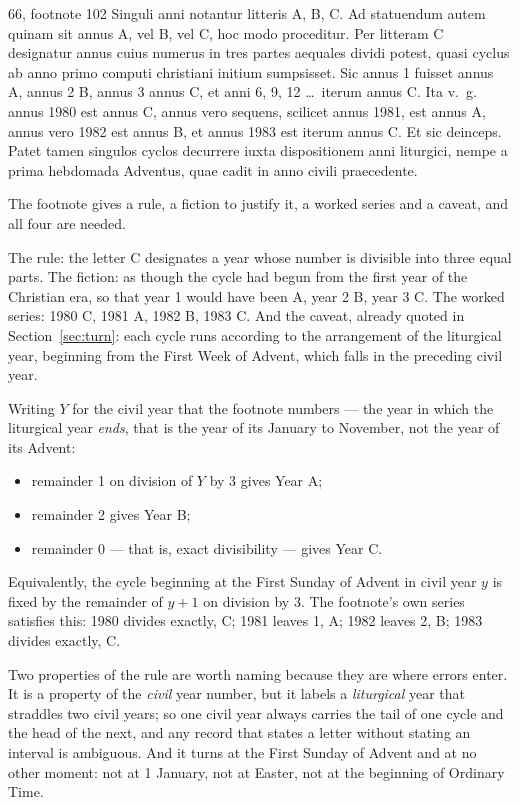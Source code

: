 \begin{normtext}{  66, footnote 102}
Singuli anni notantur litteris A, B, C. Ad statuendum autem quinam sit annus A, vel B, vel C, hoc
modo proceditur. Per litteram C designatur annus cuius numerus in tres partes aequales dividi
potest, quasi cyclus ab anno primo computi christiani initium sumpsisset. Sic annus 1 fuisset annus
A, annus 2 B, annus 3 annus C, et anni 6, 9, 12 \dots\ iterum annus C. Ita v.~g. annus 1980 est annus
C, annus vero sequens, scilicet annus 1981, est annus A, annus vero 1982 est annus B, et annus 1983
est iterum annus C. Et sic deinceps. Patet tamen singulos cyclos decurrere iuxta dispositionem anni
liturgici, nempe a prima hebdomada Adventus, quae cadit in anno civili praecedente.
\end{normtext}

The footnote gives a rule, a fiction to justify it, a worked series and a caveat, and all four are
needed.

The rule: the letter C designates a year whose number is divisible into three equal parts. The
fiction: as though the cycle had begun from the first year of the Christian era, so that year 1 would
have been A, year 2 B, year 3 C. The worked series: 1980 C, 1981 A, 1982 B, 1983 C. And the caveat,
already quoted in Section~\ref{sec:turn}: each cycle runs according to the arrangement of the
liturgical year, beginning from the First Week of Advent, which falls in the preceding civil year.

Writing $Y$ for the civil year that the footnote numbers --- the year in which the liturgical year
\emph{ends}, that is the year of its January to November, not the year of its Advent:

\begin{itemize}
\item remainder 1 on division of $Y$ by 3 gives Year A;
\item remainder 2 gives Year B;
\item remainder 0 --- that is, exact divisibility --- gives Year C.
\end{itemize}

Equivalently, the cycle beginning at the First Sunday of Advent in civil year $y$ is fixed by the
remainder of $y+1$ on division by 3. The footnote's own series satisfies this: 1980 divides exactly,
C; 1981 leaves 1, A; 1982 leaves 2, B; 1983 divides exactly, C.

Two properties of the rule are worth naming because they are where errors enter. It is a property of
the \emph{civil} year number, but it labels a \emph{liturgical} year that straddles two civil years;
so one civil year always carries the tail of one cycle and the head of the next, and any record that
states a letter without stating an interval is ambiguous. And it turns at the First Sunday of Advent
and at no other moment: not at 1 January, not at Easter, not at the beginning of Ordinary Time.

